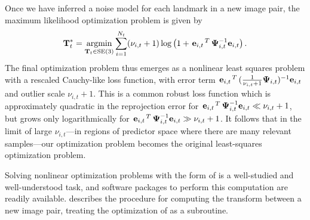 Once we have inferred a noise model for each landmark in a new image pair, the
maximum likelihood optimization problem is given by 
\begin{equation}
  \boldsymbol{\mathbf{T}}_t^* = \operatorname*{argmin}_{\boldsymbol{\mathbf{T}}_t\in\text{SE}(3)}\sum_{i=1}^{N_t} 
  (\nu_{i,t}+1)\log \left(1+ \left.{\boldsymbol{\mathbf{e}}_{i,t}}\right.^T
  \boldsymbol{\mathbf{\Psi}}_{i,t}^{-1} \boldsymbol{\mathbf{e}}_{i,t} \right).\label{eq:robust-loss}
\end{equation}
The final optimization problem thus emerges as a nonlinear least squares problem with a rescaled Cauchy-like loss
function, with error term $\left.{\boldsymbol{\mathbf{e}}_{i,t}}\right.^T
(\frac{1}{\nu_{i,t}+1}\boldsymbol{\mathbf{\Psi}}_{i,t})^{-1} \boldsymbol{\mathbf{e}}_{i,t}$ and outlier
scale $\nu_{i,t}+1$.  This is a common robust loss function which is
approximately quadratic in the reprojection error for
$\left.{\boldsymbol{\mathbf{e}}_{i,t}}\right.^T \boldsymbol{\mathbf{\Psi}}_{i,t}^{-1} \boldsymbol{\mathbf{e}}_{i,t} \ll
\nu_{i,t}+1$, but grows only logarithmically for $\left.{\boldsymbol{\mathbf{e}}_{i,t}}\right.^T
\boldsymbol{\mathbf{\Psi}}_{i,t}^{-1} \boldsymbol{\mathbf{e}}_{i,t} \gg \nu_{i,t}+1$.  It follows that in
the limit of large $\nu_{i,t}$---in regions of predictor space where there are
many relevant samples---our optimization problem becomes the original
least-squares optimization problem.

Solving nonlinear optimization problems with the form of  
is a well-studied and well-understood task, and software packages to
perform this computation are readily available. 
 describes the procedure for computing the transform
between a new image pair, treating the optimization of  as
a subroutine.

